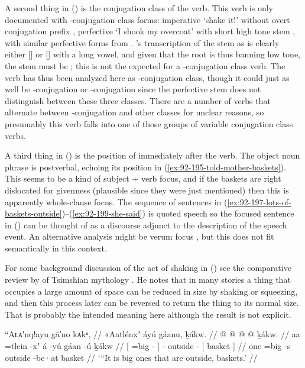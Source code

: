 A second thing in (\lastx) is the conjugation class of the verb.
This verb is only documented with -conjugation class forms: imperative  ‘shake it!’ without overt conjugation prefix \parencite[186.2562]{story-naish:1973}, perfective  ‘I shook my overcoat’ with short high tone stem  \parencite[186.2563]{story-naish:1973}, with similar perfective forms from \textcites[03/88]{leer:1973}[183]{leer:1976}.
\citeauthor{swanton:1909}’s transcription of the stem as  is clearly either [] or [] with a long vowel, and given that the root is  thus banning low tone, the stem must be ; this is not the  expected for a -conjugation class verb.
The verb has thus been analyzed here as -conjugation class, though it could just as well be -conjugation or -conjugation since the perfective stem does not distinguish between these three classes.
There are a number of verbs that alternate between -conjugation and other classes for unclear reasons, so presumably this verb falls into one of those groups of variable conjugation class verbs.

A third thing in (\lastx) is the position of  immediately after the verb.
The object noun phrase is postverbal, echoing its position in (\ref{ex:92-195-told-mother-baskets}).
This seems to be a kind of subject + verb focus, and if the baskets are right dislocated for givenness (plausible since they were just mentioned) then this is apparently whole-clause focus.
The sequence of sentences in (\ref{ex:92-197-lots-of-baskets-outside})–(\ref{ex:92-199-she-said}) is quoted speech so the focused sentence in (\lastx) can be thought of as a discourse adjunct to the description of the speech event.
An alternative analysis might be verum focus \parencites{lohnstein:2016}, but this does not fit semantically in this context.

For some background discussion of the act of shaking in (\lastx) see the comparative review by \citeauthor{boas:1916} of Tsimshian mythology \parencite[466–467]{boas:1916}.
He notes that in many stories a thing that occupies a large amount of space can be reduced in size by shaking or squeezing, and then this process later can be reversed to return the thing to its normal size.
That is probably the intended meaning here although the result is not explicit.

\ex\label{ex:92-197-lots-of-baskets-outside}%
%
\begingl
	\glpreamble	“Aʟᴀ′nq!ayu gā′no kᴀkᵘ, //
	\glpreamble	«\!Aatlénxʼ áyú gáanu, ḵákw. //
	\gla	{}  @ {} @ {} {}  @ {}
		 @ {}
		{} ḵákw. {} //
	\glb	{} aa =tlein -xʼ {} á -yú
		gáan -ú
		{} ḵákw {} //
	\glc	{}[  =big - {}]  -
		outside -
		{}[ basket {}] //
	\gld	{} one =big -s {}  {}
		outside -be·at
		{} basket {} //
	\glft	‘“It is big ones that are outside, baskets.’
		//
\endgl
\xe

